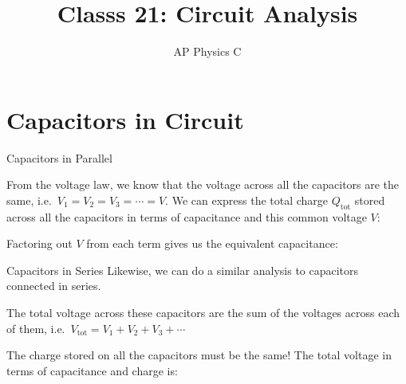 \documentclass[12pt,aspectratio=169]{beamer}
\title{Classs 21: Circuit Analysis}
\subtitle{AP Physics C}
\begin{document}
\begin{frame}
  \maketitle
\end{frame}



\section{Capacitors in Circuit}

\begin{frame}{Capacitors in Parallel}
  \begin{center}
  \end{center}
  From the voltage law, we know that the voltage across all the capacitors are
  the same, i.e.\ $V_1=V_2=V_3=\cdots=V$. We can express the total charge
  $Q_\text{tot}$ stored across all the capacitors in terms of capacitance and
  this common voltage $V$: 

  
  Factoring out $V$ from each term gives us the equivalent capacitance:

\end{frame}



\begin{frame}{Capacitors in Series}
  Likewise, we can do a similar analysis to capacitors connected in series.
  \begin{center}
  \end{center}
  The total voltage across these capacitors are the sum of the voltages across
  each of them, i.e.\ $V_\text{tot}=V_1+V_2+V_3+\cdots$
  
  \vspace{.1in}The charge stored on all the capacitors must be the same! The
  total voltage in terms of capacitance and charge is:

\end{frame}
\end{document}
